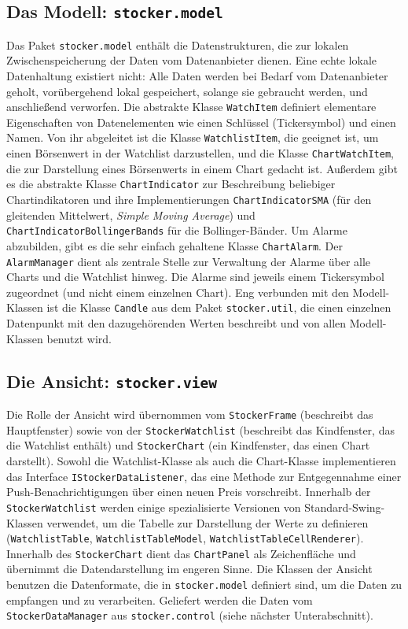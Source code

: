 \documentclass[fontsize=12pt, paper=a4, pagesize=auto, twoside=false, DIV=11, draft=false]{scrartcl}
\begin{document}
\subsection{Das Modell: \texttt{stocker.model}}
Das Paket \texttt{stocker.model} enthält die Datenstrukturen, die zur lokalen Zwischenspeicherung der Daten vom Datenanbieter dienen. Eine echte lokale Datenhaltung existiert nicht: Alle Daten werden bei Bedarf vom Datenanbieter geholt, vorübergehend lokal gespeichert, solange sie gebraucht werden, und anschließend verworfen. Die abstrakte Klasse \texttt{Watch\-Item} definiert elementare Eigenschaften von Datenelementen wie einen Schlüssel (Tickersymbol) und einen Namen. Von ihr abgeleitet ist die Klasse \texttt{Watchlist\-Item}, die geeignet ist, um einen Börsenwert in der Watchlist darzustellen, und die Klasse \texttt{Chart\-Watch\-Item}, die zur Darstellung eines Börsenwerts in einem Chart gedacht ist. Außerdem gibt es die abstrakte Klasse \texttt{ChartIndicator} zur Beschreibung beliebiger Chartindikatoren und ihre Implementierungen \texttt{Chart\-Indicator\-SMA} (für den gleitenden Mittelwert, \textit{Simple Moving Average}) und \texttt{ChartIndicatorBollingerBands} für die Bollinger-Bänder. Um Alarme abzubilden, gibt es die sehr einfach gehaltene Klasse \texttt{Chart\-Alarm}. Der \texttt{AlarmManager} dient als zentrale Stelle zur Verwaltung der Alarme über alle Charts und die Watchlist hinweg. Die Alarme sind jeweils einem Tickersymbol zugeordnet (und nicht einem einzelnen Chart). Eng verbunden mit den Modell-Klassen ist die Klasse \texttt{Candle} aus dem Paket \texttt{stocker.util}, die einen einzelnen Datenpunkt mit den dazugehörenden Werten beschreibt und von allen Modell-Klassen benutzt wird. 

\subsection{Die Ansicht: \texttt{stocker.view}}
Die Rolle der Ansicht wird übernommen vom \texttt{StockerFrame} (beschreibt das Hauptfenster) sowie von der \texttt{StockerWatchlist} (beschreibt das Kindfenster, das die Watchlist enthält) und \texttt{StockerChart} (ein Kindfenster, das einen Chart darstellt). Sowohl die Watchlist-Klasse als auch die Chart-Klasse implementieren das Interface \texttt{IStocker\-Data\-Listener}, das eine Methode zur Entgegennahme einer Push-Be\-nach\-rich\-ti\-gung\-en über einen neuen Preis vorschreibt. Innerhalb der \texttt{Stocker\-Watchlist} werden einige spezialisierte Versionen von Standard-Swing-Klassen verwendet, um die Tabelle zur Darstellung der Werte zu definieren (\texttt{WatchlistTable}, \texttt{Watchlist\-Table\-Model}, \texttt{Watchlist\-Table\-Cell\-Renderer}). Innerhalb des \texttt{Stocker\-Chart} dient das \texttt{ChartPanel} als Zeichenfläche und übernimmt die Datendarstellung im engeren Sinne. Die Klassen der Ansicht benutzen die Datenformate, die in \texttt{stocker.model} definiert sind, um die Daten zu empfangen und zu verarbeiten. Geliefert werden die Daten vom \texttt{Stocker\-Data\-Manager} aus \texttt{stocker\-.control} (siehe nächster Unterabschnitt).
 
\end{document}
